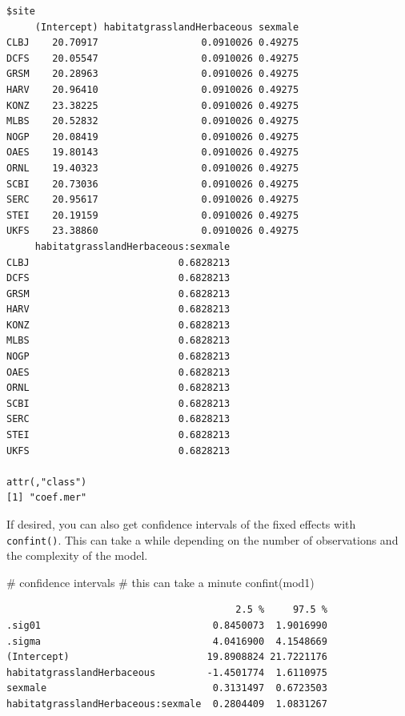 \documentclass[
  13,
  letterpaper,
]{report}
\newenvironment{Shaded}{\begin{snugshade}}{\end{snugshade}}
\newcommand{\CommentTok}[1]{\textcolor[rgb]{0.37,0.37,0.37}{#1}}
\newcommand{\FunctionTok}[1]{\textcolor[rgb]{0.28,0.35,0.67}{#1}}
\newcommand{\NormalTok}[1]{\textcolor[rgb]{0.00,0.23,0.31}{#1}}
\begin{document}
\begin{verbatim}
$site
     (Intercept) habitatgrasslandHerbaceous sexmale
CLBJ    20.70917                  0.0910026 0.49275
DCFS    20.05547                  0.0910026 0.49275
GRSM    20.28963                  0.0910026 0.49275
HARV    20.96410                  0.0910026 0.49275
KONZ    23.38225                  0.0910026 0.49275
MLBS    20.52832                  0.0910026 0.49275
NOGP    20.08419                  0.0910026 0.49275
OAES    19.80143                  0.0910026 0.49275
ORNL    19.40323                  0.0910026 0.49275
SCBI    20.73036                  0.0910026 0.49275
SERC    20.95617                  0.0910026 0.49275
STEI    20.19159                  0.0910026 0.49275
UKFS    23.38860                  0.0910026 0.49275
     habitatgrasslandHerbaceous:sexmale
CLBJ                          0.6828213
DCFS                          0.6828213
GRSM                          0.6828213
HARV                          0.6828213
KONZ                          0.6828213
MLBS                          0.6828213
NOGP                          0.6828213
OAES                          0.6828213
ORNL                          0.6828213
SCBI                          0.6828213
SERC                          0.6828213
STEI                          0.6828213
UKFS                          0.6828213

attr(,"class")
[1] "coef.mer"
\end{verbatim}

If desired, you can also get confidence intervals of the fixed effects
with \texttt{confint()}. This can take a while depending on the number
of observations and the complexity of the model.

\begin{Shaded}
\begin{Highlighting}[]
\CommentTok{\# confidence intervals}
\CommentTok{\# this can take a minute}
\FunctionTok{confint}\NormalTok{(mod1)}
\end{Highlighting}
\end{Shaded}

\begin{verbatim}
                                        2.5 %     97.5 %
.sig01                              0.8450073  1.9016990
.sigma                              4.0416900  4.1548669
(Intercept)                        19.8908824 21.7221176
habitatgrasslandHerbaceous         -1.4501774  1.6110975
sexmale                             0.3131497  0.6723503
habitatgrasslandHerbaceous:sexmale  0.2804409  1.0831267
\end{verbatim}
\end{document}
